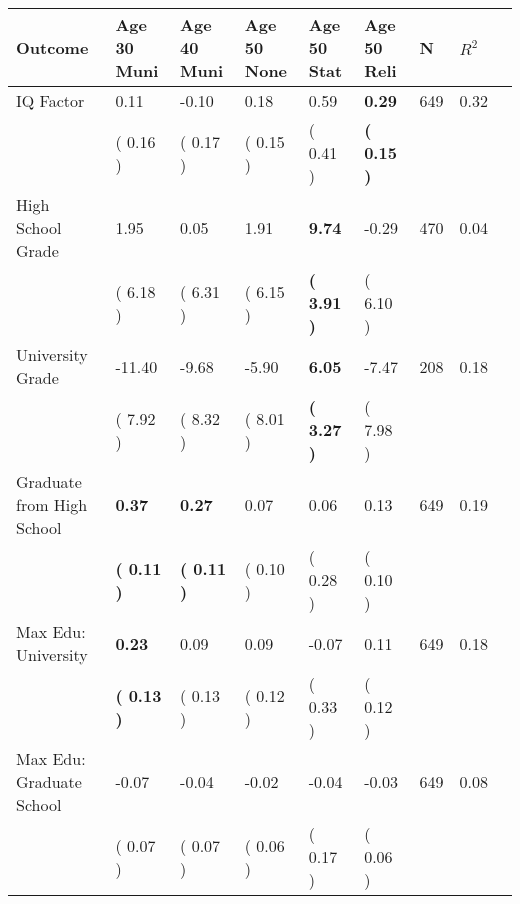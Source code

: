 \begin{tabular}{L{6.2cm} C{1.8cm} C{1.8cm} C{1.8cm} C{1.8cm} C{1.8cm} C{1.8cm} C{0.3cm} C{0.3cm}}
\toprule
 \textbf{Outcome} & \textbf{Age 30 Muni} & \textbf{Age 40 Muni} & \textbf{Age 50 None} & \textbf{Age 50 Stat} & \textbf{Age 50 Reli} & \textbf{N} & \textbf{$ R^2$} \\
\midrule
IQ Factor &      0.11 &     -0.10 &      0.18 &      0.59 & \textbf{     0.29}  & 649 &       0.32 \\ 
 & (     0.16 ) & (     0.17 ) & (     0.15 ) & (     0.41 ) & \textbf{(     0.15 )}  & \\
High School Grade &      1.95 &      0.05 &      1.91 & \textbf{     9.74} &     -0.29  & 470 &       0.04 \\ 
 & (     6.18 ) & (     6.31 ) & (     6.15 ) & \textbf{(     3.91 )} & (     6.10 )  & \\
University Grade &    -11.40 &     -9.68 &     -5.90 & \textbf{     6.05} &     -7.47  & 208 &       0.18 \\ 
 & (     7.92 ) & (     8.32 ) & (     8.01 ) & \textbf{(     3.27 )} & (     7.98 )  & \\
Graduate from High School & \textbf{     0.37} & \textbf{     0.27} &      0.07 &      0.06 &      0.13  & 649 &       0.19 \\ 
 & \textbf{(     0.11 )} & \textbf{(     0.11 )} & (     0.10 ) & (     0.28 ) & (     0.10 )  & \\
Max Edu: University & \textbf{     0.23} &      0.09 &      0.09 &     -0.07 &      0.11  & 649 &       0.18 \\ 
 & \textbf{(     0.13 )} & (     0.13 ) & (     0.12 ) & (     0.33 ) & (     0.12 )  & \\
Max Edu: Graduate School &     -0.07 &     -0.04 &     -0.02 &     -0.04 &     -0.03  & 649 &       0.08 \\ 
 & (     0.07 ) & (     0.07 ) & (     0.06 ) & (     0.17 ) & (     0.06 )  & \\
\bottomrule
\end{tabular}
